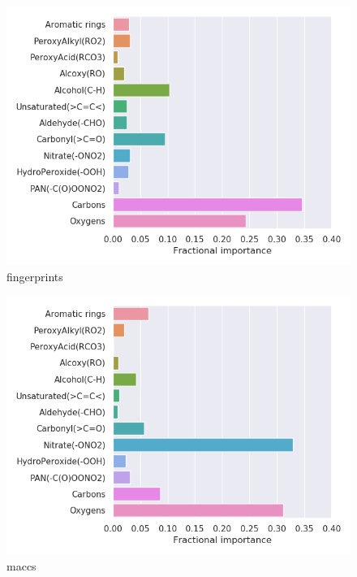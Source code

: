 \begin{subfigure}[b]{0.4\textwidth}
    \centering
    \includegraphics[width=\textwidth]{outputs/t-SNE/fingerprints/legend.png}
    \caption{fingerprints}
    \label{fig:legend_t-SNE_fingerprints}
\end{subfigure}
\begin{subfigure}[b]{0.4\textwidth}
    \centering
    \includegraphics[width=\textwidth]{outputs/t-SNE/maccs/legend.png}
    \caption{maccs}
    \label{fig:legend_t-SNE_maccs}
\end{subfigure}
